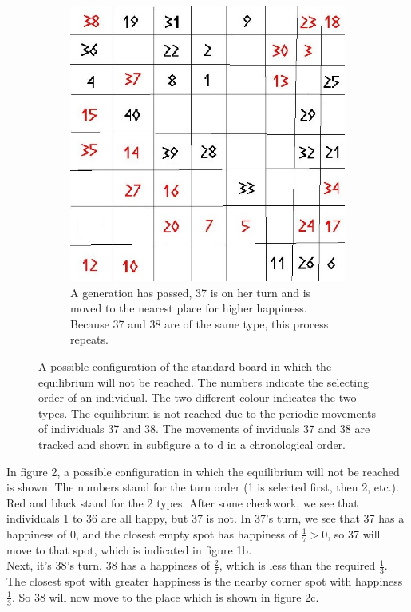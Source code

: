 \begin{figure}[H]
\begin{subfigure}{0.3\textwidth}
        \includegraphics[width=\textwidth]{Tegenvoorbeeld/segregation_tegenvb_3.jpg}
        
        \caption{A generation has passed, 37 is on her turn and is moved to the nearest place for higher happiness. Because 37 and 38 are of the same type, this process repeats. }
        \label{fig:movement4}
    \end{subfigure}
    \caption{A possible configuration of the standard board in which the equilibrium will not be reached. The numbers indicate the selecting order of an individual. The two different colour indicates the two types. The equilibrium is not reached due to the periodic movements of individuals 37 and 38. The movements of inviduals 37 and 38 are tracked and shown in subfigure a to d in a chronological order.}\label{fig:equilibrium counterexample}
\end{figure}
In figure 2, a possible configuration in which the equilibrium will not be reached is shown. The numbers stand for the turn order (1 is selected first, then 2, etc.). Red and black stand for the 2 types. After some checkwork, we see that individuals 1 to 36 are all happy, but 37 is not. In 37's turn, we see that 37 has a happiness of $0$, and the closest empty spot has happiness of $\frac{1}{7} > 0$, so 37 will move to that spot, which is indicated in figure 1b.
\\Next, it's 38's turn. 38 has a happiness of $\frac{2}{7}$, which is less than the required $\frac{1}{3}$. The closest spot with greater happiness is the nearby corner spot with happiness $\frac{1}{3}$. So 38 will now move to the place which is shown in figure 2c.\\
